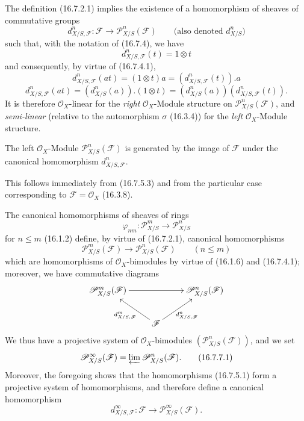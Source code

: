 \begin{env}[16.7.5]
\label{IV.16.7.5}
The definition (16.7.2.1) implies the existence of a homomorphism of sheaves
of commutative groups
\[
  d_{X/S,\mathscr{F}}^n:\mathscr{F}
  \longrightarrow\mathscr{P}_{X/S}^n(\mathscr{F})
  \qquad\text{(also denoted $d_{X/S}^n$)}
  \tag{16.7.5.1}
  \label{IV.16.7.5.1}
\]
such that, with the notation of (16.7.4), we have
\[
  d_{X/S,\mathscr{F}}^n(t)=1\otimes t
  \tag{16.7.5.2}
  \label{IV.16.7.5.2}
\]
and consequently, by virtue of (16.7.4.1),
\[
  d_{X/S,\mathscr{F}}^n(at)
  =(1\otimes t)a=(d_{X/S,\mathscr{F}}^n(t)).a
  \tag{16.7.5.3}
  \label{IV.16.7.5.3}
\]
\[
  d_{X/S,\mathscr{F}}^n(at)
  =(d_{X/S}^n(a)).(1\otimes t)
  =(d_{X/S}^n(a))(d_{X/S,\mathscr{F}}^n(t)).
  \tag{16.7.5.4}
  \label{IV.16.7.5.4}
\]
It is therefore $\mathcal{O}_X$-linear for the \emph{right}
$\mathcal{O}_X$-Module structure on $\mathscr{P}_{X/S}^n(\mathscr{F})$, and
\emph{semi-linear} (relative to the automorphism $\sigma$ (16.3.4)) for
the \emph{left} $\mathcal{O}_X$-Module structure.
\end{env}

\begin{proposition}[16.7.6]
\label{IV.16.7.6}
The left $\mathcal{O}_X$-Module $\mathscr{P}_{X/S}^n(\mathscr{F})$ is
generated by the image of $\mathscr{F}$ under the canonical homomorphism
$d_{X/S,\mathscr{F}}^n$.
\end{proposition}

This follows immediately from (16.7.5.3) and from the particular case
corresponding to $\mathscr{F}=\mathcal{O}_X$ (16.3.8).

\begin{env}[16.7.7]
\label{IV.16.7.7}
The canonical homomorphisms of sheaves of rings
\[
  \varphi_{nm}:\mathscr{P}_{X/S}^m\longrightarrow\mathscr{P}_{X/S}^n
\]
for $n\leq m$ (16.1.2) define, by virtue of (16.7.2.1), canonical
homomorphisms
\[
  \mathscr{P}_{X/S}^m(\mathscr{F})
  \longrightarrow\mathscr{P}_{X/S}^n(\mathscr{F})\qquad(n\leq m)
\]
which are homomorphisms of $\mathcal{O}_X$-bimodules by virtue of (16.1.6)
and (16.7.4.1); moreover, we have commutative diagrams
\[
  \xymatrix{
    \mathscr{P}_{X/S}^m(\mathscr{F})\ar[rr]
      &&\mathscr{P}_{X/S}^n(\mathscr{F})\\
    &\mathscr{F}\ar[ul]^-{d_{X/S,\mathscr{F}}^m}
      \ar[ur]_-{d_{X/S,\mathscr{F}}^n}
  }
\]
We thus have a projective system of $\mathcal{O}_X$-bimodules
$(\mathscr{P}_{X/S}^n(\mathscr{F}))$, and we set
\[
  \mathscr{P}_{X/S}^{\infty}(\mathscr{F})
  =\varprojlim\mathscr{P}_{X/S}^n(\mathscr{F}).
  \tag{16.7.7.1}
  \label{IV.16.7.7.1}
\]
Moreover, the foregoing shows that the homomorphisms (16.7.5.1) form a
projective system of homomorphisms, and therefore define a canonical
homomorphism
\[
  d_{X/S,\mathscr{F}}^{\infty}:\mathscr{F}
  \longrightarrow\mathscr{P}_{X/S}^{\infty}(\mathscr{F}).
  \tag{16.7.7.2}
  \label{IV.16.7.7.2}
\]
\end{env}


